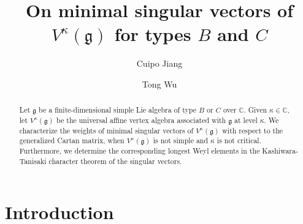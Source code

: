 \documentclass[11pt,a4paper]{amsart}
\title[Minimal singular vectors in types B and C]
{On minimal singular vectors of $V^\kappa(\mathfrak{g})$ for types $B$ and $C$}
\author{Cuipo Jiang}
\author{Tong Wu}
\date{}
\theoremstyle{plain}
\numberwithin{equation}{section}
\begin{document}
\begin{abstract}
Let $\mathfrak{g}$ be  a finite-dimensional simple Lie algebra of type $B$ or $C$ over 
${\mathbb C}$. Given $\kappa\in{\mathbb C}$, let  $V^\kappa(\mathfrak{g})$  be the universal affine vertex algebra associated with $\mathfrak{g}$ at  level $\kappa$.  We  characterize the weights of minimal singular vectors of $V^\kappa(\mathfrak{g})$ with respect to the generalized Cartan matrix, when $V^\kappa(\mathfrak{g})$  is not simple and $\kappa$ is not critical. Furthermore, we determine  the  corresponding longest Weyl elements in the  Kashiwara-Tanisaki character theorem of  the  singular vectors.
\end{abstract}

\maketitle
\tableofcontents
\newpage

\section{Introduction}\label{sec:introduction}
\end{document}
